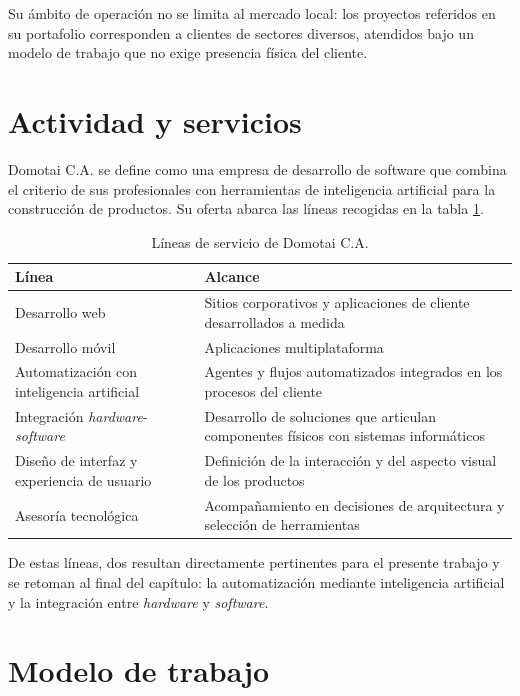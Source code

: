 Su ámbito de operación no se limita al mercado local: los proyectos referidos en
su portafolio corresponden a clientes de sectores diversos, atendidos bajo un
modelo de trabajo que no exige presencia física del cliente.

\section{Actividad y servicios}

Domotai C.A. se define como una empresa de desarrollo de software que combina el
criterio de sus profesionales con herramientas de inteligencia artificial para la
construcción de productos. Su oferta abarca las líneas recogidas en la tabla
\ref{tab:servicios}.

\begin{table}[H]
  \centering
  \caption{Líneas de servicio de Domotai C.A.}
  \label{tab:servicios}
  \begin{tabular}{@{}lp{}@{}}
    \toprule
    \textbf{Línea} & \textbf{Alcance} \\
    \midrule
    Desarrollo web & Sitios corporativos y aplicaciones de cliente
      desarrollados a medida \\
    Desarrollo móvil & Aplicaciones multiplataforma \\
    Automatización con inteligencia artificial & Agentes y flujos automatizados
      integrados en los procesos del cliente \\
    Integración \emph{hardware}-\emph{software} & Desarrollo de soluciones que
      articulan componentes físicos con sistemas informáticos \\
    Diseño de interfaz y experiencia de usuario & Definición de la interacción y
      del aspecto visual de los productos \\
    Asesoría tecnológica & Acompañamiento en decisiones de arquitectura y
      selección de herramientas \\
    \bottomrule
  \end{tabular}
\end{table}

De estas líneas, dos resultan directamente pertinentes para el presente trabajo y
se retoman al final del capítulo: la automatización mediante inteligencia
artificial y la integración entre \emph{hardware} y \emph{software}.

\section{Modelo de trabajo}

